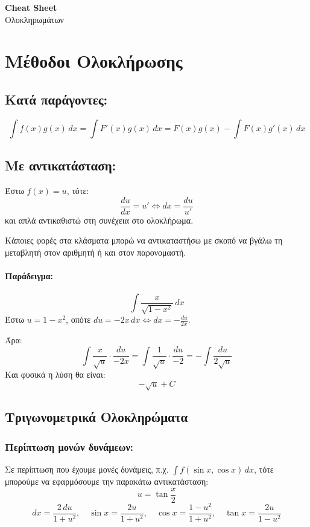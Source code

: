 \documentclass[a4paper,12pt]{article}
\begin{document}
\begin{center}
    \LARGE \textbf{Cheat Sheet}\\[1ex]
    \large Ολοκληρωμάτων
\end{center}

\section*{Μέθοδοι Ολοκλήρωσης}

\subsection*{Κατά παράγοντες:}
\[
\int f(x)g(x)\,dx = \int F'(x)g(x)\,dx = F(x)g(x) - \int F(x)g'(x)\,dx
\]

\subsection*{Με αντικατάσταση:}
Έστω $f(x) = u$, τότε:
\[
\frac{du}{dx} = u' \iff dx = \frac{du}{u'}
\]
και απλά αντικαθιστώ στη συνέχεια στο ολοκλήρωμα.

Κάποιες φορές στα κλάσματα μπορώ να αντικαταστήσω με σκοπό να βγάλω τη μεταβλητή στον αριθμητή ή και στον παρονομαστή.

\paragraph{Παράδειγμα:}
\[
\int \frac{x}{\sqrt{1-x^2}}\,dx
\]
Έστω $u = 1-x^2$, οπότε $du = -2x\,dx \iff dx = -\frac{du}{2x}$.

Άρα:
\[
\int \frac{x}{\sqrt{u}} \cdot \frac{du}{-2x} = \int \frac{1}{\sqrt{u}} \cdot \frac{du}{-2} = -\int \frac{du}{2\sqrt{u}}
\]
Και φυσικά η λύση θα είναι:
\[
-\sqrt{u} + C
\]

\subsection*{Τριγωνομετρικά Ολοκληρώματα}

\subsubsection*{Περίπτωση μονών δυνάμεων:}
Σε περίπτωση που έχουμε μονές δυνάμεις, π.χ. $\int f(\sin x, \cos x)\,dx$, τότε μπορούμε να εφαρμό\-σουμε την παρακάτω αντικατάσταση:
\[
u = \tan\frac{x}{2}
\]
\[
dx = \frac{2\,du}{1 + u^2}, \quad \sin x = \frac{2u}{1+u^2}, \quad \cos x = \frac{1-u^2}{1+u^2}, \quad \tan x = \frac{2u}{1-u^2}
\]
\end{document}
